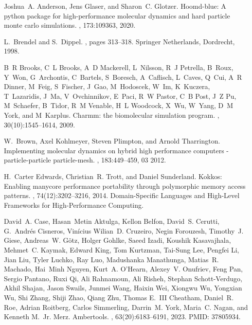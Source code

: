 \documentclass[Afour,sageh,times]{sagej}
\begin{document}
\begin{thebibliography}{99}


Joshua~A. Anderson, Jens Glaser, and Sharon~C. Glotzer.
\newblock Hoomd-blue: A python package for high-performance molecular dynamics
  and hard particle monte carlo simulations.
, 173:109363, 2020.

L.~Brendel and S.~Dippel.
, pages
  313--318.
\newblock Springer Netherlands, Dordrecht, 1998.

B~R Brooks, C~L Brooks, A~D Mackerell, L~Nilsson, R~J Petrella, B~Roux, Y~Won,
  G~Archontis, C~Bartels, S~Boresch, A~Caflisch, L~Caves, Q~Cui, A~R Dinner,
  M~Feig, S~Fischer, J~Gao, M~Hodoscek, W~Im, K~Kuczera, T~Lazaridis, J~Ma,
  V~Ovchinnikov, E~Paci, R~W Pastor, C~B Post, J~Z Pu, M~Schaefer, B~Tidor, R~M
  Venable, H~L Woodcock, X~Wu, W~Yang, D~M York, and M~Karplus.
\newblock Charmm: the biomolecular simulation program.
, 30(10):1545--1614, 2009.

W.~Brown, Axel Kohlmeyer, Steven Plimpton, and Arnold Tharrington.
\newblock Implementing molecular dynamics on hybrid high performance computers
  - particle-particle particle-mesh.
, 183:449--459, 03 2012.

H.~{Carter Edwards}, Christian~R. Trott, and Daniel Sunderland.
\newblock Kokkos: Enabling manycore performance portability through polymorphic
  memory access patterns.
,
  74(12):3202--3216, 2014.
\newblock Domain-Specific Languages and High-Level Frameworks for
  High-Performance Computing.

David~A. Case, Hasan~Metin Aktulga, Kellon Belfon, David~S. Cerutti, G.~Andrés
  Cisneros, Vinícius Wilian~D. Cruzeiro, Negin Forouzesh, Timothy~J. Giese,
  Andreas~W. Götz, Holger Gohlke, Saeed Izadi, Koushik Kasavajhala, Mehmet~C.
  Kaymak, Edward King, Tom Kurtzman, Tai-Sung Lee, Pengfei Li, Jian Liu, Tyler
  Luchko, Ray Luo, Madushanka Manathunga, Matias~R. Machado, Hai~Minh Nguyen,
  Kurt~A. O’Hearn, Alexey~V. Onufriev, Feng Pan, Sergio Pantano, Ruxi Qi, Ali
  Rahnamoun, Ali Risheh, Stephan Schott-Verdugo, Akhil Shajan, Jason Swails,
  Junmei Wang, Haixin Wei, Xiongwu Wu, Yongxian Wu, Shi Zhang, Shiji Zhao,
  Qiang Zhu, Thomas E.~III Cheatham, Daniel~R. Roe, Adrian Roitberg, Carlos
  Simmerling, Darrin~M. York, Maria~C. Nagan, and Kenneth M.~Jr. Merz.
\newblock Ambertools.
,
  63(20):6183--6191, 2023.
\newblock PMID: 37805934.


\end{thebibliography}
\end{document}
